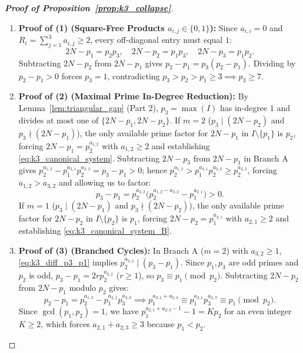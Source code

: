 \documentclass[11pt,a4paper]{article}
\theoremstyle{definition}
\begin{document}
\begin{proof}[\textbf{Proof of Proposition~\ref{prop:k3_collapse}}]
\begin{enumerate}
    \item \textbf{Proof of (1) (Square-Free Products $a_{i,j} \in \{0, 1\}$):}  
    Since $a_{i,i} = 0$ and $R_i = \sum_{j=1}^3 a_{i,j} \ge 2$, every off-diagonal entry must equal $1$:
    \begin{equation}
    \label{eq:k3_sqfree_system}
    2N - p_1 = p_2 p_3, \quad 2N - p_2 = p_1 p_3, \quad 2N - p_3 = p_1 p_2.
    \end{equation}
    Subtracting $2N - p_2$ from $2N - p_1$ gives $p_2 - p_1 = p_3(p_2 - p_1)$. Dividing by $p_2 - p_1 > 0$ forces $p_3 = 1$, contradicting $p_3 > p_2 > p_1 \ge 3 \implies p_3 \ge 7$.

    \item \textbf{Proof of (2) (Maximal Prime In-Degree Reduction):}  
    By Lemma~\ref{lem:triangular_gap} (Part 2), $p_3 = \max(I)$ has in-degree $1$ and divides at most one of $\{2N - p_1, 2N - p_2\}$. If $m = 2$ ($p_3 \mid (2N - p_2)$ and $p_3 \nmid (2N - p_1)$), the only available prime factor for $2N - p_1$ in $I \setminus \{p_1\}$ is $p_2$, forcing $2N - p_1 = p_2^{a_{1,2}}$ with $a_{1,2} \ge 2$ and establishing \eqref{eq:k3_canonical_system}. Subtracting $2N - p_3$ from $2N - p_1$ in Branch A gives $p_2^{a_{1,2}} - p_1^{a_{3,1}} p_2^{a_{3,2}} = p_3 - p_1 > 0$; hence $p_2^{a_{1,2}} > p_1^{a_{3,1}} p_2^{a_{3,2}} \ge p_2^{a_{3,2}}$, forcing $a_{1,2} > a_{3,2}$ and allowing us to factor:
    \begin{equation}
    \label{eq:k3_diff_p3_p1}
    p_3 - p_1 = p_2^{a_{3,2}}\bigl(p_2^{a_{1,2} - a_{3,2}} - p_1^{a_{3,1}}\bigr) > 0.
    \end{equation}
    If $m = 1$ ($p_3 \mid (2N - p_1)$ and $p_3 \nmid (2N - p_2)$), the only available prime factor for $2N - p_2$ in $I \setminus \{p_2\}$ is $p_1$, forcing $2N - p_2 = p_1^{a_{2,1}}$ with $a_{2,1} \ge 2$ and establishing \eqref{eq:k3_canonical_system_B}.

    \item \textbf{Proof of (3) (Branched Cycles):}  
    In Branch A ($m = 2$) with $a_{3,2} \ge 1$, \eqref{eq:k3_diff_p3_p1} implies $p_2^{a_{3,2}} \mid (p_3 - p_1)$. Since $p_1, p_3$ are odd primes and $p_2$ is odd, $p_3 - p_1 = 2r p_2^{a_{3,2}}$ ($r \ge 1$), so $p_3 \equiv p_1 \pmod{p_2}$. Subtracting $2N - p_2$ from $2N - p_1$ modulo $p_2$ gives:
    \[
    p_2 - p_1 = p_2^{a_{1,2}} - p_1^{a_{2,1}} p_3^{a_{2,3}} \implies p_1^{a_{2,1} + a_{2,3}} \equiv p_1^{a_{2,1}} p_3^{a_{2,3}} \equiv p_1 \pmod{p_2}.
    \]
    Since $\gcd(p_1, p_2) = 1$, we have $p_1^{a_{2,1} + a_{2,3} - 1} - 1 = K p_2$ for an even integer $K \ge 2$, which forces $a_{2,1} + a_{2,3} \ge 3$ because $p_1 < p_2$.
    

\end{enumerate}
\end{proof}
\end{document}

